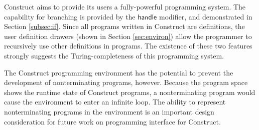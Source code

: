 \documentclass[twoside,openright,11pt]{report}
\begin{document}
Construct aims to provide its users a fully-powerful programming system. 
The capability for branching is provided by the $\mathsf{handle}$ modifier, and demonstrated in Section \ref{subsec:if}. 
Since all programs written in Construct are definitions, the user definition drawers (shown in Section \ref{sec:environ}) allow the programmer to recursively use other definitions in programs.
The existence of these two features strongly suggests the Turing-completeness of this programming system.

The Construct programming environment has the potential to prevent the development of nonterminating programs, however. 
Because the program space shows the runtime state of Construct programs, a nonterminating program would cause the environment to enter an infinite loop.
The ability to represent nonterminating programs in the environment is an important design consideration for future work on programming interface for Construct.

\appendix



\end{document}
